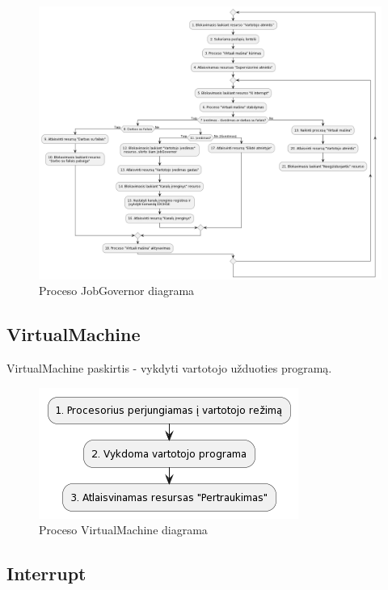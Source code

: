 \documentclass{VUMIFInfKursinis}
\begin{document}
\begin{figure}[H]
	\centering	
	\includegraphics[scale=0.3]{img/JobGovernor}
	\caption{Proceso JobGovernor diagrama}   %
	\label{img:JobGovernor}
\end{figure}

\subsection{VirtualMachine}

VirtualMachine paskirtis - vykdyti vartotojo užduoties programą.

\begin{figure}[H]
	\centering	
	\includegraphics[scale=0.65]{img/VirtualMachine}
	\caption{Proceso VirtualMachine diagrama}   %
	\label{img:VirtualMachine}
\end{figure}

\subsection{Interrupt}
\end{document}
